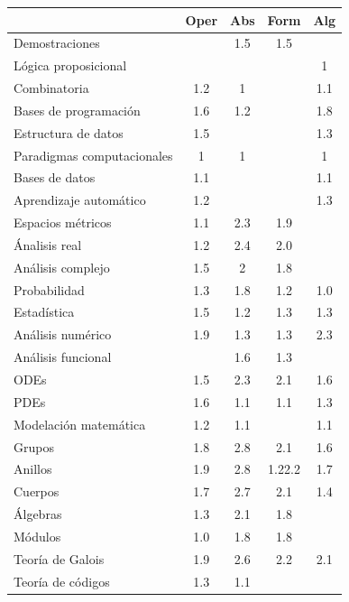 \begin{refsection}
\begin{table}[H]
\begin{center}
\end{center}
\begin{center}
\begin{tabular}{|l|c|c|c|c|}
\hline
\rowcolor[HTML]{00C0F3} 
\multicolumn{1}{|c|}{\cellcolor[HTML]{00C0F3} \textbf{Contenidos}} & \textbf{Oper}& \textbf{Abs} & \textbf{Form} & \textbf{Alg} \\ \hline
Demostraciones &  & 1.5 & 1.5 &  \\ \hline
Lógica proposicional &  &  &  & 1 \\ \hline
Combinatoria & 1.2 & 1 &  & 1.1 \\ \hline
Bases de programación & 1.6 & 1.2 &  & 1.8 \\ \hline
Estructura de datos & 1.5 &  &  & 1.3 \\ \hline
Paradigmas computacionales & 1 & 1 &  & 1 \\ \hline
Bases de datos & 1.1 &  &  & 1.1 \\ \hline
Aprendizaje automático & 1.2 &  &  & 1.3 \\ \hline
Espacios métricos & 1.1 & 2.3 & 1.9 &  \\ \hline
Ánalisis real & 1.2 & 2.4 & 2.0 &  \\ \hline
Análisis complejo & 1.5 & 2 & 1.8 &  \\ \hline
Probabilidad & 1.3 & 1.8 & 1.2 & 1.0 \\ \hline
Estadística & 1.5 & 1.2 & 1.3 & 1.3 \\ \hline
Análisis numérico & 1.9 & 1.3 & 1.3 & 2.3 \\ \hline
Análisis funcional &  & 1.6 & 1.3 &  \\ \hline
ODEs & 1.5 & 2.3 & 2.1 & 1.6 \\ \hline
PDEs & 1.6 & 1.1 & 1.1 & 1.3 \\ \hline
Modelación  matemática & 1.2 & 1.1 &  & 1.1 \\ \hline
Grupos & 1.8 & 2.8 & 2.1 & 1.6 \\ \hline
Anillos & 1.9 & 2.8 & 1.22.2 & 1.7 \\ \hline
Cuerpos & 1.7 & 2.7 & 2.1 & 1.4 \\ \hline
Álgebras & 1.3 & 2.1 & 1.8 &  \\ \hline
Módulos & 1.0 & 1.8 & 1.8 &  \\ \hline
Teoría de Galois & 1.9 & 2.6 & 2.2 & 2.1 \\ \hline
Teoría de códigos & 1.3 & 1.1 &  &  \\ \hline

\end{tabular}
\end{center}
\end{table}
\end{refsection}
